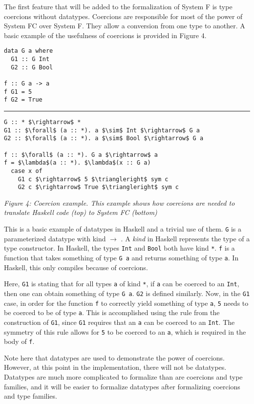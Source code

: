\documentclass{sig-alternate}
\begin{document}
The first feature that will be added to the formalization of System F is type coercions without datatypes.  Coercions are responsible for most of the power of System FC over System F. They allow a conversion from one type to another. A basic example of the usefulness of coercions is provided in Figure 4.
\begin{verbatim}
data G a where
  G1 :: G Int
  G2 :: G Bool

f :: G a -> a
f G1 = 5
f G2 = True
\end{verbatim}
\hrule
\begin{lstlisting}
G :: * $\rightarrow$ *
G1 :: $\forall$ (a :: *). a $\sim$ Int $\rightarrow$ G a
G2 :: $\forall$ (a :: *). a $\sim$ Bool $\rightarrow$ G a

f :: $\forall$ (a :: *). G a $\rightarrow$ a
f = $\lambda$(a :: *). $\lambda$(x :: G a)
  case x of
    G1 c $\rightarrow$ 5 $\triangleright$ sym c
    G2 c $\rightarrow$ True $\triangleright$ sym c
\end{lstlisting}
\begin{center}
\it Figure 4: Coercion example. This example shows how coercions are needed to translate Haskell code (top) to System FC (bottom)
\end{center}

This is a basic example of datatypes in Haskell and a trivial use of them. \texttt{G} is a parameterized datatype with kind {\tt *} $\rightarrow$ {\tt *}. A \textit{kind} in Haskell represents the type of a type constructor. In Haskell, the types \texttt{Int} and \texttt{Bool} both have kind \texttt{*}. \texttt{f} is a function that takes something of type \texttt{G a} and returns something of type \texttt{a}. In Haskell, this only compiles because of coercions.

Here, \texttt{G1} is stating that for all types \texttt{a} of kind \texttt{*}, if \texttt{a} can be coerced to an \texttt{Int}, then one can obtain something of type \texttt{G a}. \texttt{G2} is defined similarly. Now, in the \texttt{G1} case, in order for the function \texttt{f} to correctly yield something of type \texttt{a}, \texttt{5} needs to be coerced to be of type \texttt{a}. This is accomplished using the rule from the construction of \texttt{G1}, since \texttt{G1} requires that an \texttt{a} can be coerced to an \texttt{Int}. The symmetry of this rule allows for \texttt{5} to be coerced to an \texttt{a}, which is required in the body of \texttt{f}. 

Note here that datatypes are used to demonstrate the power of coercions. However, at this point in the implementation, there will not be datatypes. Datatypes are much more complicated to formalize than are coercions and type families, and it will be easier to formalize datatypes after formalizing coercions and type families.
\end{document}
